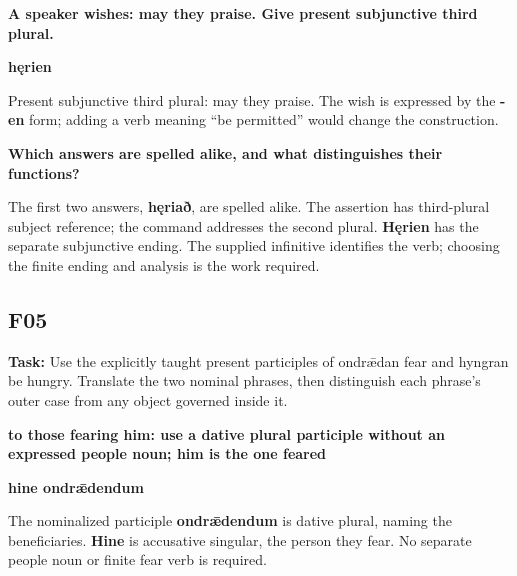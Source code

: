 \textbf{A speaker wishes: may they praise. Give present subjunctive third plural.}

\textbf{hęrien}

Present subjunctive third plural: may they praise. The wish is expressed by the \textbf{-en} form; adding a verb meaning “be permitted” would change the construction.

\textbf{Which answers are spelled alike, and what distinguishes their functions?}

The first two answers, \textbf{hęriað}, are spelled alike. The assertion has third-plural subject reference; the command addresses the second plural. \textbf{Hęrien} has the separate subjunctive ending. The supplied infinitive identifies the verb; choosing the finite ending and analysis is the work required.

\subsection*{F05}

\textbf{Task:} Use the explicitly taught present participles of ondrǣdan fear and hyngran be hungry. Translate the two nominal phrases, then distinguish each phrase's outer case from any object governed inside it.

\textbf{to those fearing him: use a dative plural participle without an expressed people noun; him is the one feared}

\textbf{hine ondrǣdendum}

The nominalized participle \textbf{ondrǣdendum} is dative plural, naming the beneficiaries. \textbf{Hine} is accusative singular, the person they fear. No separate people noun or finite fear verb is required.

